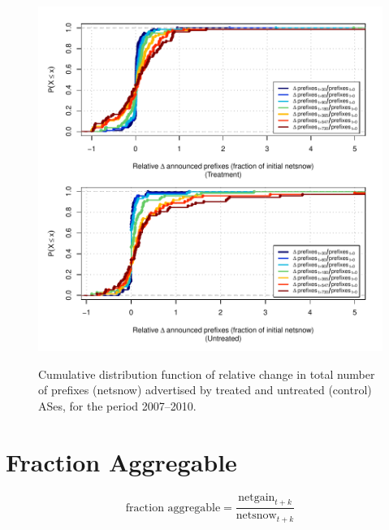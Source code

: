 \begin{figure}[H]
\begin{centering}
\begin{singlespace}
    \includegraphics[width=6in]{figures/behavior-rel_netsnow-2007_2010-corr.pdf}
    \vspace{-2em}\\
    \caption{Cumulative distribution function of relative change in total
    number of prefixes (netsnow) advertised by treated and untreated (control)
    ASes, for the period 2007--2010.}
\end{singlespace}
\end{centering}
\end{figure}

\section{Fraction Aggregable}

\[
\textrm{fraction aggregable} = \frac{\textrm{netgain}_{t+k}}
                                    {\textrm{netsnow}_{t+k}}
\]

